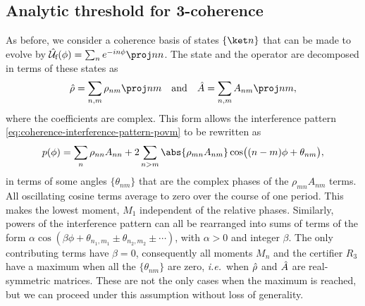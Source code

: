 \subsection{Analytic threshold for 3-coherence}

As before, we consider a coherence basis of states $\{\ket n\}$ that can be made to evolve by $\U_{\text f}(\phi) = \sum_n e^{-in\phi}\proj nn$.
The state and the operator are decomposed in terms of these states as
\begin{equation}
\op\rho = \sum_{n,m} \rho_{nm}\proj nm \quad\text{and}\quad \op A = \sum_{n,m} A_{nm}\proj nm,
\end{equation}
where the coefficients are complex.
This form allows the interference pattern \cref{eq:coherence-interference-pattern-povm} to be rewritten as
\begin{equation}\label{eq:coherence-interference-pattern-explicit}
p(\phi) = \sum_n\rho_{nn}A_{nn} + 2\sum_{n>m}\abs{\rho_{mn}A_{nm}}\cos\bigl((n-m)\phi + \theta_{nm}\bigr),
\end{equation}
in terms of some angles $\{\theta_{nm}\}$ that are the complex phases of the $\rho_{mn}A_{nm}$ terms.
All oscillating cosine terms average to zero over the course of one period.
This makes the lowest moment, $M_1$ independent of the relative phases.
Similarly, powers of the interference pattern can all be rearranged into sums of terms of the form $\alpha \cos(\beta\phi + \theta_{n_1,m_1} \pm \theta_{n_2,m_2}\pm\dotsb)$, with $\alpha>0$ and integer $\beta$.
The only contributing terms have $\beta = 0$, consequently all moments $M_n$ and the certifier $R_3$ have a maximum when all the $\{\theta_{nm}\}$ are zero, \textit{i.e.}\ when $\hat{\rho}$ and $\hat{A}$ are real-symmetric matrices.
These are not the only cases when the maximum is reached, but we can proceed under this assumption without loss of generality.

